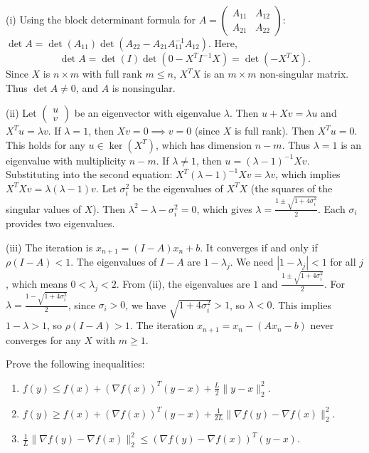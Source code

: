 \begin{solution}
(i) Using the block determinant formula for $A = \begin{pmatrix} A_{11} & A_{12} \\ A_{21} & A_{22} \end{pmatrix}$: $\det A = \det(A_{11}) \det(A_{22} - A_{21} A_{11}^{-1} A_{12})$. Here,
\[
\det A = \det(I) \det(0 - X^T I^{-1} X) = \det(-X^T X).
\]
Since $X$ is $n \times m$ with full rank $m \leq n$, $X^T X$ is an $m \times m$ non-singular matrix. Thus $\det A \neq 0$, and $A$ is nonsingular.

(ii) Let $\begin{pmatrix} u \\ v \end{pmatrix}$ be an eigenvector with eigenvalue $\lambda$. Then $u + Xv = \lambda u$ and $X^T u = \lambda v$.
If $\lambda = 1$, then $Xv = 0 \implies v=0$ (since $X$ is full rank). Then $X^T u = 0$. This holds for any $u \in \ker(X^T)$, which has dimension $n-m$. Thus $\lambda=1$ is an eigenvalue with multiplicity $n-m$.
If $\lambda \neq 1$, then $u = (\lambda - 1)^{-1} Xv$. Substituting into the second equation: $X^T (\lambda - 1)^{-1} Xv = \lambda v$, which implies $X^T X v = \lambda(\lambda - 1) v$.
Let $\sigma_i^2$ be the eigenvalues of $X^T X$ (the squares of the singular values of $X$). Then $\lambda^2 - \lambda - \sigma_i^2 = 0$, which gives $\lambda = \frac{1 \pm \sqrt{1+4\sigma_i^2}}{2}$. Each $\sigma_i$ provides two eigenvalues.

(iii) The iteration is $x_{n+1} = (I-A)x_n + b$. It converges if and only if $\rho(I-A) < 1$. The eigenvalues of $I-A$ are $1-\lambda_j$. We need $|1-\lambda_j| < 1$ for all $j$, which means $0 < \lambda_j < 2$.
From (ii), the eigenvalues are $1$ and $\frac{1 \pm \sqrt{1+4\sigma_i^2}}{2}$.
For $\lambda = \frac{1 - \sqrt{1+4\sigma_i^2}}{2}$, since $\sigma_i > 0$, we have $\sqrt{1+4\sigma_i^2} > 1$, so $\lambda < 0$. This implies $1-\lambda > 1$, so $\rho(I-A) > 1$.
The iteration $x_{n+1} = x_n - (Ax_n - b)$ never converges for any $X$ with $m \geq 1$.
\end{solution}

\begin{exercise}
\label{applied:2014:9}

Prove the following inequalities:

\begin{enumerate}
\item[(i)] $f(y)\leq f(x)+(\nabla f(x))^{T}(y-x)+\frac{L}{2}\|y-x\|_{2}^{2}$.
\item[(ii)] $f(y)\geq f(x)+(\nabla f(x))^{T}(y-x)+\frac{1}{2L}\|\nabla f(y)-\nabla f(x)\|_{2}^{2}$.
\item[(iii)] $\frac{1}{L}\|\nabla f(y)-\nabla f(x)\|_{2}^{2}\leq(\nabla f(y)-\nabla f(x))^{T}(y-x)$.
\end{enumerate}
\end{exercise}

